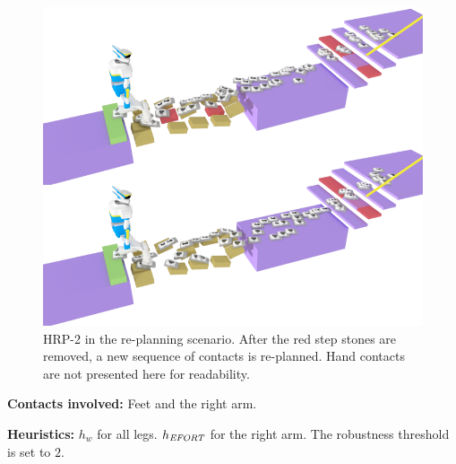 \documentclass[journal]{IEEEtran}
\begin{document}
\begin{figure}
  \centering
  \includegraphics[width=0.7\linewidth]{figures/replanning}
  \caption{
           HRP-2 in the re-planning scenario. After the red step stones are removed, a new sequence of contacts is re-planned. Hand contacts
           are not presented here for readability.}
		   \label{fig:re-planning}
\end{figure}

\noindent\textbf{Contacts involved:} Feet and the right arm.

\noindent\textbf{Heuristics:} $h_w$  for all legs. $h_{\textrm{\it EFORT}}$  for the right arm. The robustness threshold is set to $2$.



 
\end{document}
